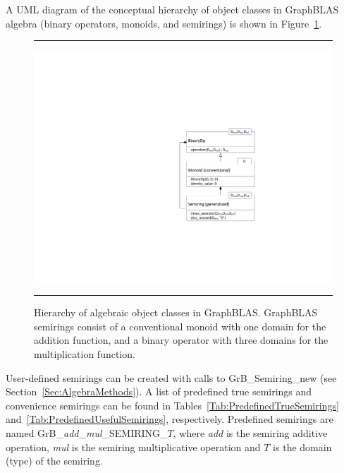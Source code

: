 A UML diagram of the conceptual hierarchy of object classes in GraphBLAS
algebra (binary operators, monoids, and semirings) is shown in 
Figure~\ref{Fig:AlgebraHierarchy}.

\begin{figure}[htb]
    \hrule
    \begin{center}
        \includegraphics[width=1.0\linewidth,trim=3in 2in 0.5in 2in]{Algebra_Hierarchy_v2_1.pdf}
    \end{center}
    \caption{Hierarchy of algebraic object classes in GraphBLAS. GraphBLAS 
    semirings consist of a conventional monoid with one domain for the addition 
    function, and a binary operator with three domains for the multiplication function.}
    \label{Fig:AlgebraHierarchy}
    \hrule
\end{figure}

User-defined semirings can be created with calls to {\sf GrB\_Semiring\_new} 
(see Section~\ref{Sec:AlgebraMethods}).
A list of predefined true semirings and convenience
semirings can be found in Tables~\ref{Tab:PredefinedTrueSemirings} and~\ref{Tab:PredefinedUsefulSemirings},
respectively.  Predefined
semirings are named {\sf GrB\_\emph{add}\_\emph{mul}\_SEMIRING\_$T$},
where \emph{add} is the semiring additive operation, \emph{mul} is
the semiring multiplicative operation and $T$ is the domain (type)
of the semiring.


